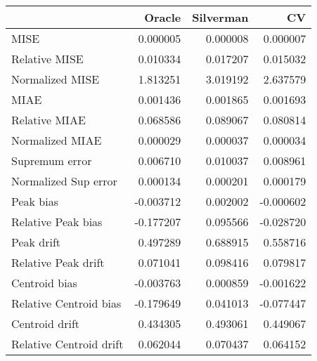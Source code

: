 \begin{tabular}{lrrr}
  \toprule
 & Oracle & Silverman & CV \\ 
  \midrule
MISE & 0.000005 & 0.000008 & 0.000007 \\ 
  Relative MISE & 0.010334 & 0.017207 & 0.015032 \\ 
  Normalized MISE & 1.813251 & 3.019192 & 2.637579 \\ 
  MIAE & 0.001436 & 0.001865 & 0.001693 \\ 
  Relative MIAE & 0.068586 & 0.089067 & 0.080814 \\ 
  Normalized MIAE & 0.000029 & 0.000037 & 0.000034 \\ 
  Supremum error & 0.006710 & 0.010037 & 0.008961 \\ 
  Normalized Sup error & 0.000134 & 0.000201 & 0.000179 \\ 
  Peak bias & -0.003712 & 0.002002 & -0.000602 \\ 
  Relative Peak bias & -0.177207 & 0.095566 & -0.028720 \\ 
  Peak drift & 0.497289 & 0.688915 & 0.558716 \\ 
  Relative Peak drift & 0.071041 & 0.098416 & 0.079817 \\ 
  Centroid bias & -0.003763 & 0.000859 & -0.001622 \\ 
  Relative Centroid bias & -0.179649 & 0.041013 & -0.077447 \\ 
  Centroid drift & 0.434305 & 0.493061 & 0.449067 \\ 
  Relative Centroid drift & 0.062044 & 0.070437 & 0.064152 \\ 
   \bottomrule
\end{tabular}
